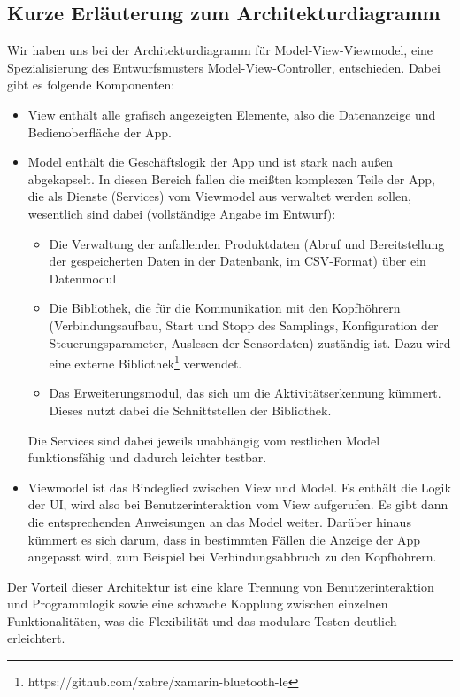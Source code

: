 \documentclass[a4paper,12pt]{article}
\begin{document}
  \subsection{Kurze Erläuterung zum Architekturdiagramm}
  Wir haben uns bei der Architekturdiagramm für \textsf{Model-View-Viewmodel}, eine Spezialisierung  des Entwurfsmusters Model-View-Controller, entschieden.
  Dabei gibt es folgende Komponenten:
  \begin{itemize}
    \item \textsf{\glqq View\grqq{}} enthält alle grafisch angezeigten Elemente, also die Datenanzeige und Bedienoberfläche der App.
    \item {\textsf{\glqq Model\grqq{}} enthält die Geschäftslogik der App und ist stark nach außen abgekapselt. In diesen Bereich fallen die meißten komplexen Teile der App, die als Dienste (Services) vom Viewmodel aus verwaltet werden sollen, wesentlich sind dabei (vollständige Angabe im Entwurf): \begin{itemize}
      \item Die Verwaltung der anfallenden Produktdaten (Abruf und Bereitstellung der gespeicherten Daten in der Datenbank, im CSV-Format) über ein Datenmodul
      \item Die Bibliothek, die für die Kommunikation mit den Kopfhöhrern (Verbindungsaufbau, Start und Stopp des Samplings, Konfiguration der \Gls{Steuerungsparameter}, Auslesen der Sensordaten) zuständig ist. Dazu wird eine externe Bibliothek\footnote{https://github.com/xabre/xamarin-bluetooth-le} verwendet.
      \item Das Erweiterungsmodul, das sich um die Aktivitätserkennung kümmert. Dieses nutzt dabei die Schnittstellen der Bibliothek.
    \end{itemize}
    Die Services sind dabei jeweils unabhängig vom restlichen Model funktionsfähig und dadurch leichter testbar.}
    \item \textsf{\glqq Viewmodel\grqq{}} ist das Bindeglied zwischen View und Model. Es enthält die Logik der UI, wird also bei Benutzerinteraktion vom View aufgerufen. Es gibt dann die entsprechenden Anweisungen an das Model weiter. Darüber hinaus kümmert es sich darum, dass in bestimmten Fällen die Anzeige der App angepasst wird, zum Beispiel bei Verbindungsabbruch zu den Kopfhöhrern. 
    
  \end{itemize}
  Der Vorteil dieser Architektur ist eine klare Trennung von Benutzerinteraktion und Programmlogik sowie eine schwache Kopplung zwischen einzelnen Funktionalitäten, was die Flexibilität und das modulare Testen deutlich erleichtert.
\end{document}
